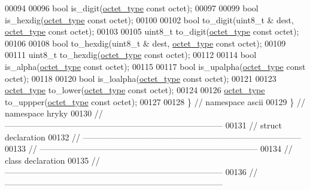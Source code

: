 \begin{DoxyCode}
{00094 
00096     \textcolor{keywordtype}{bool} is\_digit(\hyperlink{namespacehryky_a488cba8b666be33ccca70e819684e3c8}{octet_type} \textcolor{keyword}{const} octet);
00097 
00099     \textcolor{keywordtype}{bool} is\_hexdig(\hyperlink{namespacehryky_a488cba8b666be33ccca70e819684e3c8}{octet_type} \textcolor{keyword}{const} octet);
00100 
00102     \textcolor{keywordtype}{bool} to\_digit(uint8\_t & dest, \hyperlink{namespacehryky_a488cba8b666be33ccca70e819684e3c8}{octet_type} \textcolor{keyword}{const} octet);
00103 
00105     uint8\_t to\_digit(\hyperlink{namespacehryky_a488cba8b666be33ccca70e819684e3c8}{octet_type} \textcolor{keyword}{const} octet);
00106 
00108     \textcolor{keywordtype}{bool} to\_hexdig(uint8\_t & dest, \hyperlink{namespacehryky_a488cba8b666be33ccca70e819684e3c8}{octet_type} \textcolor{keyword}{const} octet);
00109 
00111     uint8\_t to\_hexdig(\hyperlink{namespacehryky_a488cba8b666be33ccca70e819684e3c8}{octet_type} \textcolor{keyword}{const} octet);
00112 
00114     \textcolor{keywordtype}{bool} is\_alpha(\hyperlink{namespacehryky_a488cba8b666be33ccca70e819684e3c8}{octet_type} \textcolor{keyword}{const} octet);
00115 
00117     \textcolor{keywordtype}{bool} is\_upalpha(\hyperlink{namespacehryky_a488cba8b666be33ccca70e819684e3c8}{octet_type} \textcolor{keyword}{const} octet);
00118 
00120     \textcolor{keywordtype}{bool} is\_loalpha(\hyperlink{namespacehryky_a488cba8b666be33ccca70e819684e3c8}{octet_type} \textcolor{keyword}{const} octet);
00121 
00123     \hyperlink{namespacehryky_a488cba8b666be33ccca70e819684e3c8}{octet_type} to\_lower(\hyperlink{namespacehryky_a488cba8b666be33ccca70e819684e3c8}{octet_type} \textcolor{keyword}{const} octet);
00124 
00126     \hyperlink{namespacehryky_a488cba8b666be33ccca70e819684e3c8}{octet_type} to\_uppper(\hyperlink{namespacehryky_a488cba8b666be33ccca70e819684e3c8}{octet_type} \textcolor{keyword}{const} octet);
00127 
00128 \} \textcolor{comment}{// namespace ascii}
00129 \} \textcolor{comment}{// namespace hryky}
00130 \textcolor{comment}{//
      ------------------------------------------------------------------------------}
00131 \textcolor{comment}{// struct declaration}
00132 \textcolor{comment}{//
      ------------------------------------------------------------------------------}
00133 \textcolor{comment}{//
      ------------------------------------------------------------------------------}
00134 \textcolor{comment}{// class declaration}
00135 \textcolor{comment}{//
      ------------------------------------------------------------------------------}
00136 \textcolor{comment}{//
      ------------------------------------------------------------------------------}
}
\end{DoxyCode}
